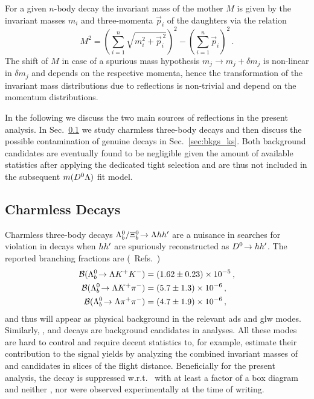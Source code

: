 For a given $n$-body decay the invariant mass of the mother $M$ is given by the invariant masses $m_i$ and three-momenta $\vec{p}_i$ of the daughters via the relation
\begin{equation*}
    M^2 = \left( \sum_{i=1}^n \sqrt{m_i^2 + \vec{p}_i^{\,2}} \right)^2 - \left( \sum_{i=1}^n \vec{p}_i \right)^2 \,.
\end{equation*}
The shift of $M$ in case of a spurious mass hypothesis $m_j \to m_j + \delta m_j$ is non-linear in $\delta m_j$ and depends on the respective momenta, hence the transformation of the invariant mass distributions due to \glspl{reflection} is non-trivial and depend on the momentum distributions.

In the following we discuss the two main sources of \glspl{reflection} in the present analysis.
In Sec.~\ref{sec:bkgs_charmless} we study charmless three-body decays and then discuss the possible contamination of genuine \KS decays in Sec.~\ref{sec:bkgs_ks}.
Both background candidates are eventually found to be negligible given the amount of available statistics after applying the dedicated tight \decay{\Lb}{\Dz\Lz} selection and are thus not included in the subsequent $m({{D}^0}{\Lambda})$ fit model.

\subsection{Charmless Decays}
\label{sec:bkgs_charmless}
Charmless three-body decays ${{\Lambda}^0_{b}}/{{\Xi}^0_{b}}\!\rightarrow {\ensuremath{\Lambda}}hh'$ are a nuisance in searches for \CP violation in \decay{\Lb}{\Dz\Lz} decays when $hh'$ are spuriously reconstructed as ${{D}^0}\!\rightarrow hh'$.
The reported branching fractions are (\cf{}~Refs.~\cite{pdg,LbToLzhh})
\begin{align*}
    {\ensuremath{\mathcal{B}}}({{\Lambda}^0_{b}}\!\rightarrow {\ensuremath{\Lambda}}{\ensuremath{{K}^+}}{\ensuremath{{K}^-}}) &= (1.62 \pm 0.23) \times 10^{-5} \,, \\
    {\mathcal{B}}({{\Lambda}^0_{b}}\!\rightarrow {\ensuremath{\Lambda}}{\ensuremath{{K}^+}}{\ensuremath{{\pi}^-}}) &= (5.7 \pm 1.3) \times 10^{-6} \,, \\
    {\mathcal{B}}({{\Lambda}^0_{b}}\!\rightarrow {\ensuremath{\Lambda}}{\ensuremath{{\pi}^+}}{\ensuremath{{\pi}^-}}) &= (4.7 \pm 1.9) \times 10^{-6} \,, 
\end{align*}
and thus will appear as physical background in the relevant \gls{ads} and \gls{glw} modes.
Similarly, \decay{\Xibz}{\Lz\Kp\Km}, \decay{\Xibz}{\Lz\Km\pip} and \decay{\Xibz}{\pip\pim} decays are background candidates in \decay{\Xibz}{\Dz\Lz} analyses.
All these modes are hard to control and require decent statistics to, for example, estimate their contribution to the signal yields by analyzing the combined invariant masses of \Dz and \Lz candidates in slices of the \Dz flight distance.
Beneficially for the present analysis, the \decay{\Lb}{\Lz\Km\pip} decay is suppressed w.r.t.\ \decay{\Lb}{\Lz\Kp\pim} with at least a factor of a box diagram and neither \decay{\Lb}{\Lz\Km\pip}, nor \decay{\Xibz}{\Lz\Km\pip} were observed experimentally at the time of writing.

